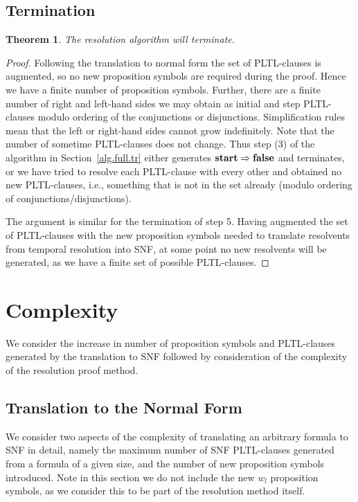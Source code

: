\documentclass[nohyperref]{acmtrans2f}
\let\imp=\Rightarrow
\def\lfalse{\hbox{\rm\bf false}}
\def\lstart{\hbox{\rm\bf start}}
\newtheorem{subtheorem}{Theorem}[subsection]
\begin{document}
\subsection{Termination}
\begin{subtheorem}
The resolution algorithm will terminate.
\end{subtheorem}
\begin{proof}
Following the translation to normal form the set of PLTL-clauses is
augmented, so no new proposition symbols are required during the proof. Hence we
have a finite number of proposition symbols. Further, there are a finite number of
right and left-hand sides we may obtain as initial and step PLTL-clauses
modulo ordering of the conjunctions or disjunctions. Simplification rules
mean that the left or right-hand sides cannot grow indefinitely. Note that
the number of sometime PLTL-clauses does not change. Thus step (3) of the
algorithm in Section~\ref{alg.full.tr} either generates $\lstart \imp \lfalse$ and
terminates, or we have tried to resolve each PLTL-clause with every other 
and obtained no new PLTL-clauses, i.e., something that is not in the set
already (modulo ordering of conjunctions/disjunctions).

The argument is similar for the termination of step 5. Having augmented the
set of PLTL-clauses with the new proposition symbols needed to translate
resolvents from temporal resolution into SNF, at some point no new
resolvents will be generated, as we have a finite set of possible
PLTL-clauses. 
\end{proof}

\section{Complexity}
\label{sec.complex}
We consider the increase in number of proposition symbols and PLTL-clauses
generated by the translation to SNF followed by consideration of the
complexity of the resolution proof method.
\subsection{Translation to the Normal Form}
%
We consider two aspects of the complexity of translating an arbitrary
formula to SNF in detail, namely the maximum number of SNF PLTL-clauses
generated from a formula of a given size, and the number of new
proposition symbols introduced. Note in this section we do not include the
new $w_l$ proposition symbols, as we consider this to be part of the resolution
method itself. 
\end{document}
